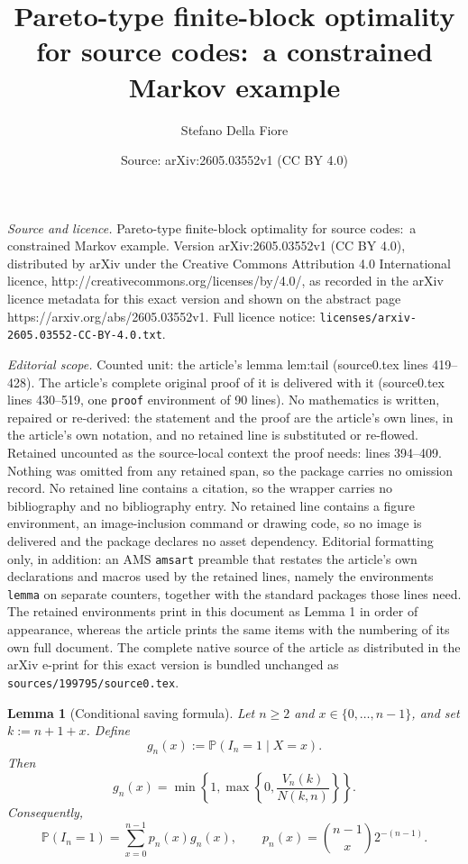 \documentclass[10pt,a4paper]{amsart}
\title{Pareto-type finite-block optimality for source codes:\ a constrained Markov example}
\author{Stefano Della Fiore}
\date{Source: arXiv:2605.03552v1 (CC BY 4.0)}
\newtheorem{lemma}{Lemma}
\newcommand{\PP}{\mathbb{P}}
\begin{document}
\maketitle

\noindent\emph{Source and licence.} Pareto-type finite-block optimality for source codes:\ a constrained Markov example. Version arXiv:2605.03552v1 (CC BY 4.0), distributed by arXiv under the Creative Commons Attribution 4.0 International licence, http://creativecommons.org/licenses/by/4.0/, as recorded in the arXiv licence metadata for this exact version and shown on the abstract page https://arxiv.org/abs/2605.03552v1. Full licence notice: \texttt{licenses/arxiv-2605.03552-CC-BY-4.0.txt}.\par\smallskip

\noindent\textit{Editorial scope.} Counted unit: the article's lemma lem:tail (source0.tex lines 419--428). The article's complete original proof of it is delivered with it (source0.tex lines 430--519, one \texttt{proof} environment of 90 lines). No mathematics is written, repaired or re-derived: the statement and the proof are the article's own lines, in the article's own notation, and no retained line is substituted or re-flowed.  Retained uncounted as the source-local context the proof needs: lines 394--409.  Nothing was omitted from any retained span, so the package carries no omission record.  No retained line contains a citation, so the wrapper carries no bibliography and no bibliography entry.  No retained line contains a figure environment, an image-inclusion command or drawing code, so no image is delivered and the package declares no asset dependency.  Editorial formatting only, in addition: an AMS \texttt{amsart} preamble that restates the article's own declarations and macros used by the retained lines, namely the environments \texttt{lemma} on separate counters, together with the standard packages those lines need.  The retained environments print in this document as Lemma 1 in order of appearance, whereas the article prints the same items with the numbering of its own full document.  The complete native source of the article as distributed in the arXiv e-print for this exact version is bundled unchanged as \texttt{sources/199795/source0.tex}.
\begin{lemma}[Conditional saving formula]\label{lem:cond}
Let $n\ge2$ and $x\in\{0,\dots,n-1\}$, and set $k:=n+1+x$. Define
\[
g_n(x):=\PP(I_n=1\mid X=x).
\]
Then
\begin{equation}\label{eq:gnV}
g_n(x)=\min\!\left\{1,\max\!\left\{0,\frac{V_n(k)}{N(k,n)}\right\}\right\}.
\end{equation}
Consequently,
\begin{equation}\label{eq:Pin-sum}
\PP(I_n=1)=\sum_{x=0}^{n-1}p_n(x)g_n(x),
\qquad
p_n(x)=\binom{n-1}{x}2^{-(n-1)}.
\end{equation}
\end{lemma}
\end{document}
